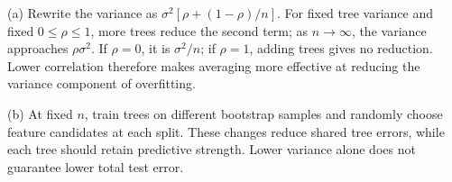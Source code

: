 (a) Rewrite the variance as \(\sigma^2[\rho+(1-\rho)/n]\). For fixed tree variance and fixed \(0\le\rho\le1\), more trees reduce the second term; as \(n\to\infty\), the variance approaches \(\rho\sigma^2\). If \(\rho=0\), it is \(\sigma^2/n\); if \(\rho=1\), adding trees gives no reduction. Lower correlation therefore makes averaging more effective at reducing the variance component of overfitting.


(b) At fixed \(n\), train trees on different bootstrap samples and randomly choose feature candidates at each split. These changes reduce shared tree errors, while each tree should retain predictive strength. Lower variance alone does not guarantee lower total test error.
